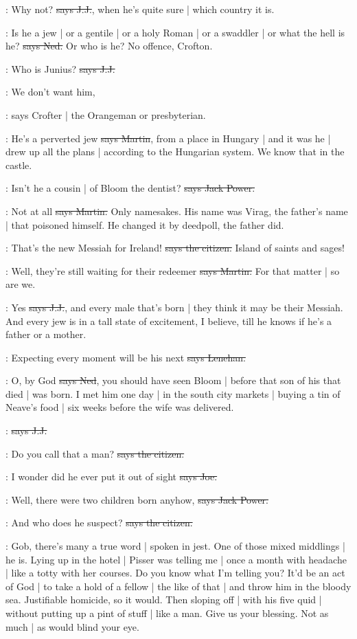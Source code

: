 \jjom:
Why not?
\sout{says J.J.},
when he's quite sure |
which country it is.

\lambert:
Is he a jew |
or a gentile |
or a holy Roman |
or a swaddler |
or what the hell is he?
\sout{says Ned.}
Or who is he?
No offence,
Crofton.

\jjom:
Who is Junius?
\sout{says J.J.}

\crofton:
We don't want him,

\Nq:
says Crofter |
the Orangeman or presbyterian.

\cunningham:
He's a perverted jew
\sout{says Martin},
from a place in Hungary |
and it was he |
drew up all the plans |
according to the Hungarian system.
We know that in the castle.

\power:
Isn't he a cousin |
of Bloom the dentist?
\sout{says Jack Power.}

\cunningham:
Not at all
\sout{says Martin.}
Only namesakes.
His name was Virag,
the father's name |
that poisoned himself.
He changed it by deedpoll,
the father did.

\citizen:
That's the new Messiah for Ireland!
\sout{says the citizen.}
Island of saints and sages!

\cunningham:
Well,
they're still waiting for their redeemer
\sout{says Martin.}
For that matter |
so are we.

\jjom:
Yes
\sout{says J.J.},
and every male that's born |
they think it may be their Messiah.
And every jew is in a tall state of excitement,
I believe,
till he knows if he's a father or a mother.

\lenehan:
Expecting every moment will be his next
\sout{says Lenehan.}

\lambert:
O,
by God
\sout{says Ned},
you should have seen Bloom |
before that son of his that died |
was born.
I met him one day |
in the south city markets |
buying a tin of Neave's food |
six weeks before the wife was delivered.

\jjom:
\sout{says J.J.}

\citizen:
Do you call that a man?
\sout{says the citizen.}

\joe:
I wonder did he ever put it out of sight
\sout{says Joe.}

\power:
Well,
there were two children born anyhow,
\sout{says Jack Power.}

\citizen:
And who does he suspect?
\sout{says the citizen.}

\Nq:
Gob,
there's many a true word |
spoken in jest.
One of those mixed middlings |
he is.
Lying up in the hotel |
Pisser was telling me |
once a month with headache |
like a totty with her courses.
Do you know what I'm telling you?
It'd be an act of God |
to take a hold of a fellow |
the like of that |
and throw him in the bloody sea.
Justifiable homicide,
so it would.
Then sloping off |
with his five quid |
without putting up a pint of stuff |
like a man.
Give us your blessing.
Not as much |
as would blind your eye.

